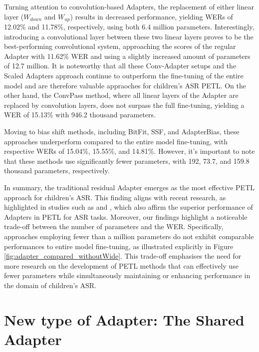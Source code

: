 Turning attention to convolution-based Adapters, the replacement of either linear layer ($W_{down}$ and $W_{up}$) results in decreased performance, yielding WERs of 12.02\% and 11.78\%, respectively, using both 6.4 million parameters. Interestingly, introducing a convolutional layer between these two linear layers proves to be the best-performing convolutional system, approaching the scores of the regular Adapter with 11.62\% WER and using a slightly increased amount of parameters of 12.7 million. It is noteworthy that all these Conv-Adapter setups and the Scaled Adapters approach continue to outperform the fine-tuning of the entire model and are therefore valuable appraoches for children's ASR PETL.
On the other hand, the ConvPass method, where all linear layers of the Adapter are replaced by convolution layers, does not surpass the full fine-tuning, yielding a WER of 15.13\% with 946.2 thousand parameters.

Moving to bias shift methods, including BitFit, SSF, and AdapterBias, these approaches underperform compared to the entire model fine-tuning, with respective WERs of 15.04\%, 15.55\%, and 14.81\%. However, it's important to note that these methods use significantly fewer parameters, with 192, 73.7, and 159.8 thousand parameters, respectively.

In summary, the traditional residual Adapter emerges as the most effective PETL approach for children's ASR. This finding aligns with recent research, as highlighted in studies such as \cite{li2023evaluating} and \cite{cappellazzo2023parameter}, which also affirm the superior performance of Adapters in PETL for ASR tasks. Moreover, our findings highlight a noticeable trade-off between the number of parameters and the WER. Specifically, approaches employing fewer than a million parameters do not exhibit comparable performances to entire model fine-tuning, as illustrated explicitly in Figure \ref{fig:adapter_compared_withoutWide}. This trade-off emphasises the need for more research on the development of PETL methods that can effectively use fewer parameters while simultaneously maintaining or enhancing performance in the domain of children's ASR.

\section{New type of Adapter: The Shared Adapter}
